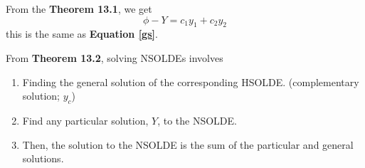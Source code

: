 \documentclass[diffeq.tex]{subfiles}
\begin{document}
    \begin{bproof}
        From the \textbf{Theorem 13.1}, we get
        \begin{equation}
            \phi - Y = c_{1}y_{1} + c_{2}y_{2}
        \end{equation}
        this is the same as \textbf{Equation \ref{gs}}.
    \end{bproof}
    From \textbf{Theorem  13.2}, solving NSOLDEs involves
    \begin{enumerate}
        \item Finding the general solution of the corresponding HSOLDE. (complementary solution; $y_c$)
        \item Find any particular solution, $Y$, to the NSOLDE.
        \item Then, the solution to the NSOLDE is the sum of the particular and general solutions.
    \end{enumerate}
    \np
\end{document}
